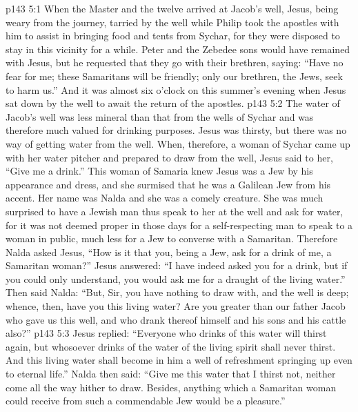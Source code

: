 \vs p143 5:1 When the Master and the twelve arrived at Jacob’s well, Jesus, being weary from the journey, tarried by the well while Philip took the apostles with him to assist in bringing food and tents from Sychar, for they were disposed to stay in this vicinity for a while. Peter and the Zebedee sons would have remained with Jesus, but he requested that they go with their brethren, saying: \textcolor{ubdarkred}{“Have no fear for me; these Samaritans will be friendly; only our brethren, the Jews, seek to harm us.”} And it was almost six o’clock on this summer’s evening when Jesus sat down by the well to await the return of the apostles.
\vs p143 5:2 The water of Jacob’s well was less mineral than that from the wells of Sychar and was therefore much valued for drinking purposes. Jesus was thirsty, but there was no way of getting water from the well. When, therefore, a woman of Sychar came up with her water pitcher and prepared to draw from the well, Jesus said to her, \textcolor{ubdarkred}{“Give me a drink.”} This woman of Samaria knew Jesus was a Jew by his appearance and dress, and she surmised that he was a Galilean Jew from his accent. Her name was Nalda and she was a comely creature. She was much surprised to have a Jewish man thus speak to her at the well and ask for water, for it was not deemed proper in those days for a self\hyp{}respecting man to speak to a woman in public, much less for a Jew to converse with a Samaritan. Therefore Nalda asked Jesus, “How is it that you, being a Jew, ask for a drink of me, a Samaritan woman?” Jesus answered: \textcolor{ubdarkred}{“I have indeed asked you for a drink, but if you could only understand, you would ask me for a draught of the living water.”} Then said Nalda: “But, Sir, you have nothing to draw with, and the well is deep; whence, then, have you this living water? Are you greater than our father Jacob who gave us this well, and who drank thereof himself and his sons and his cattle also?”\plusone
\vs p143 5:3 Jesus replied: \textcolor{ubdarkred}{“Everyone who drinks of this water will thirst again, but whosoever drinks of the water of the living spirit shall never thirst. And this living water shall become in him a well of refreshment springing up even to eternal life.”} Nalda then said: “Give me this water that I thirst not, neither come all the way hither to draw. Besides, anything which a Samaritan woman could receive from such a commendable Jew would be a pleasure.”
